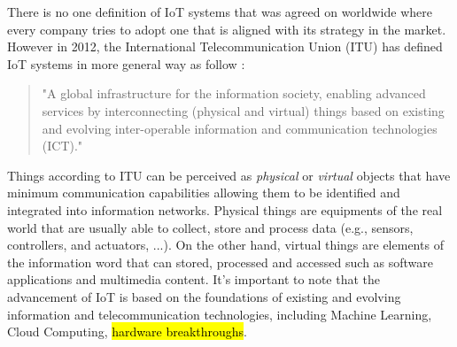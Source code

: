 \documentclass[conference]{IEEEtran}
\begin{document}
There is no one definition of IoT systems that was agreed on worldwide where every company tries to adopt one that is aligned with its strategy in the market.
However in 2012, the International Telecommunication Union (ITU) has defined IoT systems in more general way as follow \cite{itu-t_overview_2012_Y.2060}:
\begin{quote}
"A global infrastructure for the information society, enabling advanced services by interconnecting (physical and virtual) things based on existing and evolving inter-operable information and communication technologies (ICT)."
\end{quote}
Things according to ITU can be perceived as \textit{physical} or \textit{virtual} objects that have minimum communication capabilities allowing them to be identified and integrated into information networks. Physical things are equipments of the real world that are usually able to collect, store and process data (e.g., sensors, controllers, and actuators, ...). On the other hand, virtual things are elements of the information word that can stored, processed and accessed such as software applications and multimedia content. It's important to note that the advancement of IoT is based on the foundations of existing and evolving information and telecommunication technologies, including Machine Learning, Cloud Computing, \hl{hardware breakthroughs}.
\end{document}
